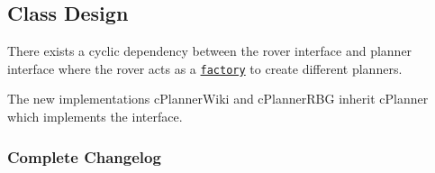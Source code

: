 \subsection*{Class Design}

There exists a cyclic dependency between the rover interface and planner interface where the rover acts as a \href{https://en.wikipedia.org/wiki/Factory_method_pattern}{\tt factory} to create different planners.

The new implementations c\+Planner\+Wiki and c\+Planner\+R\+BG inherit c\+Planner which implements the interface.



\subsubsection*{Complete Changelog}


